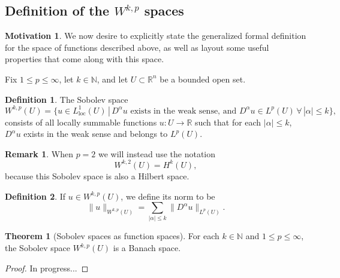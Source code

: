 \documentclass[11pt]{article}
\theoremstyle{definition}
\newtheorem*{theorem}{Theorem}
\newtheorem*{definition}{Definition}
\newtheorem*{remark}{Remark}
\newtheorem*{motivation}{Motivation}
\begin{document}
\subsection{Definition of the $W^{k,p}$ spaces}
\begin{motivation}
	We now desire to explicitly state the generalized formal definition for the space of functions described above,
	as well as layout some useful properties that come along with this space.
\end{motivation}
Fix $1 \leq p \leq \infty$, let $k \in \mathbb{N}$, and let $U \subset \mathbb{R}^n$ be a bounded open set.
\begin{definition}
	The Sobolev space
	\[W^{k,p}(U) = \{u \in L^1_{\text{loc}}(U) \, | \, D^{\alpha}u \text{ exists in the weak sense, and } D^{\alpha}u \in L^p(U) \, \forall \, |\alpha| \leq k\},\]
	consists of all locally summable functions $u : U \rightarrow \mathbb{R}$ such that for each $|\alpha| \leq k$, $D^{\alpha}u$ exists in the weak sense
	and belongs to $L^p(U)$.
\end{definition}
\begin{remark}
	When $p=2$ we will instead use the notation
	\[W^{k,2}(U) = H^k(U),\]
	because this Sobolev space is also a Hilbert space.
\end{remark}
\begin{definition}
	If $u \in W^{k,p}(U)$, we define its norm to be
	\[\|u\|_{W^{k,p}(U)} = \sum_{|\alpha| \leq k} \|D^{\alpha}u\|_{L^p(U)}.\]
\end{definition}
\begin{theorem}[Sobolev spaces as function spaces]
	For each $k \in \mathbb{N}$ and $1 \leq p \leq \infty$, the Sobolev space $W^{k,p}(U)$ is a Banach space.
\end{theorem}
\begin{proof}
	In progress...
\end{proof}

\newpage
\end{document}

